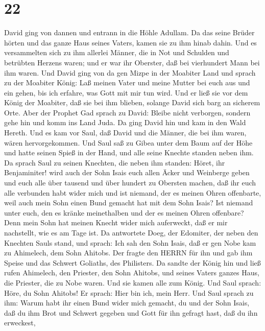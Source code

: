 \hypertarget{section-21}{%
\section{22}\label{section-21}}

 David ging von dannen und entrann in die Höhle Adullam. Da
das seine Brüder hörten und das ganze Haus seines Vaters, kamen sie zu
ihm hinab dahin.  Und es versammelten sich zu ihm allerlei
Männer, die in Not und Schulden und betrübten Herzens waren; und er war
ihr Oberster, daß bei vierhundert Mann bei ihm waren.  Und
David ging von da gen Mizpe in der Moabiter Land und sprach zu der
Moabiter König: Laß meinen Vater und meine Mutter bei euch aus und ein
gehen, bis ich erfahre, was Gott mit mir tun wird.  Und er
ließ sie vor dem König der Moabiter, daß sie bei ihm blieben, solange
David sich barg an sicherem Orte.  Aber der Prophet Gad
sprach zu David: Bleibe nicht verborgen, sondern gehe hin und komm ins
Land Juda. Da ging David hin und kam in den Wald Hereth. 
Und es kam vor Saul, daß David und die Männer, die bei ihm waren, wären
hervorgekommen. Und Saul saß zu Gibea unter dem Baum auf der Höhe und
hatte seinen Spieß in der Hand, und alle seine Knechte standen neben
ihm.  Da sprach Saul zu seinen Knechten, die neben ihm
standen: Höret, ihr Benjaminiter! wird auch der Sohn Isais euch allen
Äcker und Weinberge geben und euch alle über tausend und über hundert zu
Obersten machen,  daß ihr euch alle verbunden habt wider
mich und ist niemand, der es meinen Ohren offenbarte, weil auch mein
Sohn einen Bund gemacht hat mit dem Sohn Isais? Ist niemand unter euch,
den es kränke meinethalben und der es meinen Ohren offenbare? Denn mein
Sohn hat meinen Knecht wider mich auferweckt, daß er mir nachstellt, wie
es am Tage ist.  Da antwortete Doeg, der Edomiter, der neben
den Knechten Sauls stand, und sprach: Ich sah den Sohn Isais, daß er gen
Nobe kam zu Ahimelech, dem Sohn Ahitobs.  Der fragte den
HERRN für ihn und gab ihm Speise und das Schwert Goliaths, des
Philisters.  Da sandte der König hin und ließ rufen
Ahimelech, den Priester, den Sohn Ahitobs, und seines Vaters ganzes
Haus, die Priester, die zu Nobe waren. Und sie kamen alle zum König.
 Und Saul sprach: Höre, du Sohn Ahitobs! Er sprach: Hier
bin ich, mein Herr.  Und Saul sprach zu ihm: Warum habt ihr
einen Bund wider mich gemacht, du und der Sohn Isais, daß du ihm Brot
und Schwert gegeben und Gott für ihn gefragt hast, daß du ihn erweckest,
